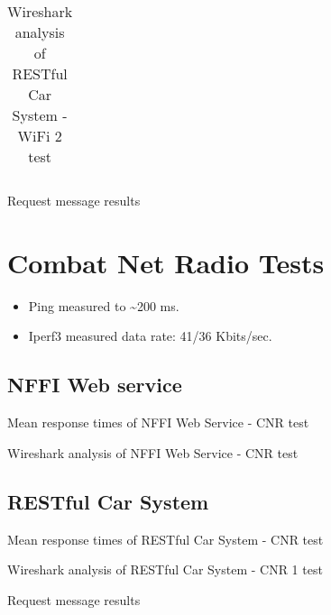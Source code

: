 \begin{appendices}
\begin{table}[H]
\begin{tabular}{lrrrr}
\end{tabular}
\caption{Wireshark analysis of RESTful Car System - WiFi 2 test}

\end{table}


\begin{table}[H]

\caption{Request message results}
\end{table}

\section{Combat Net Radio Tests}

\begin{itemize}
	\item Ping measured to \textasciitilde 200 ms.
	\item Iperf3 measured data rate: 41/36 Kbits/sec.
\end{itemize}


\subsection{NFFI Web service}

\begin{table}[H]

\caption{Mean response times of NFFI Web Service - CNR test}
\end{table}

\begin{table}[H]

\caption{Wireshark analysis of NFFI Web Service - CNR test}
\end{table}


\subsection{RESTful Car System}

\begin{table}[H]

\caption{Mean response times of RESTful Car System - CNR test}
\end{table}

\begin{table}[H]

\caption{Wireshark analysis of RESTful Car System - CNR 1 test}
\end{table}


\begin{table}[H]

\caption{Request message results}
\end{table}


\end{appendices}
